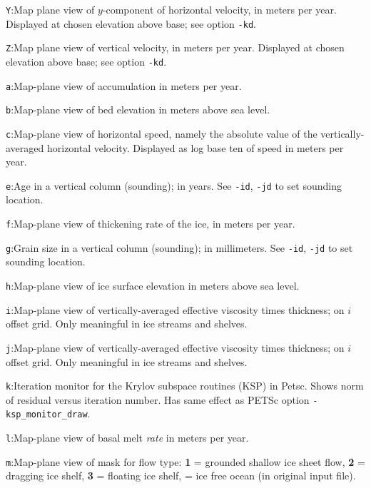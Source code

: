 \documentclass[11pt,final]{amsart}
\begin{document}
\verb|Y|:\quad Map plane view of $y$-component of horizontal velocity, in meters per year.  Displayed at chosen elevation above base; see option \verb|-kd|.

\verb|Z|:\quad Map plane view of vertical velocity, in meters per year.  Displayed at chosen elevation above base; see option \verb|-kd|.

\verb|a|:\quad Map-plane view of accumulation in meters per year.

\verb|b|:\quad Map-plane view of bed elevation in meters above sea level.

\verb|c|:\quad Map-plane view of horizontal speed, namely the absolute value of the vertically-averaged horizontal velocity.  Displayed as log base ten of speed in meters per year.

\verb|e|:\quad Age in a vertical column (sounding); in years.  See \verb|-id|, \verb|-jd| to set sounding location.

\verb|f|:\quad Map-plane view of thickening rate of the ice, in meters per year.

\verb|g|:\quad Grain size in a vertical column (sounding); in millimeters.  See \verb|-id|, \verb|-jd| to set sounding location.

\verb|h|:\quad Map-plane view of ice surface elevation in meters above sea level.

\verb|i|:\quad Map-plane view of vertically-averaged effective viscosity times thickness; on $i$ offset grid.  Only meaningful in ice streams and shelves.

\verb|j|:\quad Map-plane view of vertically-averaged effective viscosity times thickness; on $i$ offset grid.  Only meaningful in ice streams and shelves.

\verb|k|:\quad \notMat Iteration monitor for the Krylov subspace routines (KSP) in Petsc.  Shows norm of residual versus iteration number.  Has same effect as PETSc option \verb|-ksp_monitor_draw|.

\verb|l|:\quad Map-plane view of basal melt \emph{rate} in meters per year.

\verb|m|:\quad Map-plane view of mask for flow type:  \textbf{1} = grounded shallow ice sheet flow,  \textbf{2} = dragging ice shelf, \textbf{3} = floating ice shelf,  = ice free ocean (in original input file).

\end{document}
